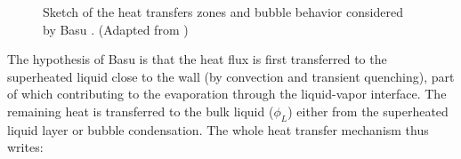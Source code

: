 \begin{figure}[h]
\centering
{}
\caption{Sketch of the heat transfers zones and bubble behavior considered by Basu \etal. (Adapted from \cite{basu_wall_2005})}
\label{fig:basu_hfp_sketch}
\end{figure}
	

The hypothesis of Basu \etal is that the heat flux is first transferred to the superheated liquid close to the wall (by convection and transient quenching), part of which contributing to the evaporation through the liquid-vapor interface. The remaining heat is transferred to the bulk liquid ($\phi_{L}$) either from the superheated liquid layer or bubble condensation. The whole heat transfer mechanism thus writes:

